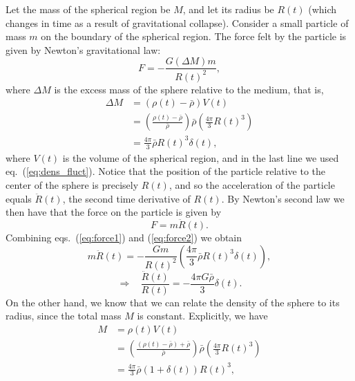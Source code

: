 Let the mass of the spherical region be $M$, and let its radius be $R(t)$ (which changes in time as a result of gravitational collapse). Consider a small particle of mass $m$ on the boundary of the spherical region. The force felt by the particle is given by Newton's gravitational law:
\begin{equation} \label{eq:force1}
F=-\frac{G(\Delta M)m}{R(t)^2},
\end{equation}
where $\Delta M$ is the excess mass of the sphere relative to the medium, that is,
\begin{equation}
\begin{split}
\Delta M&=\left(\rho(t)-\bar{\rho}\right)V(t)\\
&=\left(\frac{\rho(t)-\bar{\rho}}{\bar{\rho}}\right)\bar{\rho}\left(\frac{4\pi}{3}R(t)^3\right)\\
&=\frac{4\pi}{3}\bar{\rho} R(t)^3\delta(t),
\end{split}
\end{equation}
where $V(t)$ is the volume of the spherical region, and in the last line we used eq.\ (\ref{eq:dens_fluct}). Notice that the position of the particle relative to the center of the sphere is precisely $R(t)$, and so the acceleration of the particle equals $\ddot{R}(t)$, the second time derivative of $R(t)$. By Newton's second law we then have that the force on the particle is given by
\begin{equation} \label{eq:force2}
F=m\ddot{R}(t).
\end{equation}
Combining eqs.\ (\ref{eq:force1}) and (\ref{eq:force2}) we obtain
\begin{equation}
m\ddot{R}(t)=-\frac{Gm}{R(t)^2}\left(\frac{4\pi}{3}\bar{\rho}R(t)^3\delta(t)\right),
\end{equation}
\begin{equation} \label{eq:grav_coll1}
\Rightarrow~~~~ \frac{\ddot{R}(t)}{R(t)}=-\frac{4\pi G\bar{\rho}}{3}\delta(t).
\end{equation}
On the other hand, we know that we can relate the density of the sphere to its radius, since the total mass $M$ is constant. Explicitly, we have
\begin{equation}
\begin{split}
M&= \rho(t)V(t)\\
&=\left(\frac{\left(\rho(t)-\bar{\rho}\right)+\bar{\rho}}{\bar{\rho}}\right)\bar{\rho}\left(\frac{4\pi}{3}R(t)^3\right)\\
&=\frac{4\pi}{3}\bar{\rho} \left(1+\delta(t)\right)R(t)^3,
\end{split}
\end{equation}
